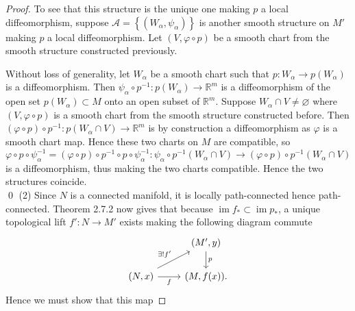 \documentclass[reqno]{amsart}
\theoremstyle{definition}
\theoremstyle{remark}
\DeclareMathOperator{\im}{im}
\begin{document}
\begin{proof}
        To see that this structure is the unique
        one making $p$ a local diffeomorphism, suppose
        $\mathcal{A} = \left\{ 
        \left( W_{\alpha}, \psi_{\alpha} \right) \right\} 
        $ is another smooth structure on
        $M'$ making $p$ a local diffeomorphism.
        Let $\left( V, \varphi  \circ p \right) $ be
        a smooth chart from the smooth structure constructed
        previously. 

        Without loss of generality,
        let $W_{\alpha} $ be a smooth chart
        such that $p \colon W_{\alpha} \to 
        p\left( W_{\alpha} \right)$ is a diffeomorphism.
        Then $\psi_{\alpha} \circ p^{-1} \colon
        p\left( W_{\alpha} \right) \to 
        \mathbb{R}^{m}$ is a diffeomorphism of
        the open set $p\left( W_{\alpha} \right) 
        \subset M$ onto an open subset of $\mathbb{R}^{m}$.
        Suppose $W_{\alpha} \cap V \neq  \varnothing$  where
        $\left( V, \varphi \circ p \right) $ is a smooth chart
        from the smooth structure constructed before.
        Then 
        $\left( \varphi \circ p \right) \circ
        p^{-1} \colon p\left( W_{\alpha} \cap V \right) 
        \to \mathbb{R}^{m}$  is by construction a diffeomorphism
        as $\varphi $ is a smooth chart map. Hence
        these two charts on $M$ are compatible, so
        $\varphi \circ p \circ \psi_{\alpha}^{-1}
        = \left( \varphi \circ p \right) \circ
        p^{-1} \circ p \circ \psi_{\alpha}^{-1} \colon
        \psi_{\alpha} \circ p^{-1} \left( 
        W_{\alpha} \cap V\right) \to 
        \left( \varphi \circ p \right) \circ p^{-1}
        \left( W_{\alpha} \cap V \right) $ is a diffeomorphism,
        thus making the two charts compatible.
        Hence the two structures coincide.\\\qed 
        \linebreak
        (2) Since $N$ is a connected manifold, it is
        locally path-connected hence path-connected. 
        Theorem 2.7.2 now gives that
        because $\im f_* \subset \im p_*$, a unique
        topological
        lift $f' \colon
        N \to M'$ exists making the following diagram commute
        \begin{equation*}
        \begin{tikzcd}
            & (M', y) \ar[d, "p"] \\
            (N,x) \ar[r, "f"'] \ar[ru, " \exists ! f'"] & (M,f(x)).
        \end{tikzcd}
        \end{equation*}
        Hence we must show that this map

\end{proof}
\end{document}
